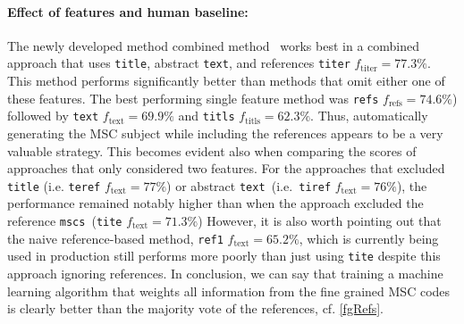 \paragraph{Effect of features and human baseline:}
The newly developed method combined method~\cite{Scharpf2020} works best in a combined approach that uses \texttt{title}, abstract \texttt{text}, and references \texttt{titer} \(f_{\mathrm{titer}} = 77.3\%.\)
This method performs significantly better than methods that omit either one of these features.
The best performing single feature method was \texttt{refs} \(f_{\mathrm{refs}} = 74.6\%\)) followed by \texttt{text} \(f_{\mathrm{text}} = 69.9\%\) and \texttt{titls} \(f_{\mathrm{titls}} = 62.3\%\).
Thus, automatically generating the MSC subject while including the references appears to be a very valuable strategy.
This becomes evident also when comparing the scores of approaches that only considered two features. For the approaches that excluded \texttt{title} (i.e. \texttt{teref} \(f_{\mathrm{text}} = 77\%\)) or abstract \texttt{text}\texttt{\ }(i.e.\texttt{\ }\texttt{tiref} \(f_{\mathrm{text}} = 76\%\)), the performance remained notably higher than when the approach excluded the reference \texttt{mscs}\ (\texttt{tite} \(f_{\mathrm{text}} = 71.3\%\))
However, it is also worth pointing out that the naive reference-based method, \texttt{ref1} \(f_{\mathrm{text}} = 65.2\%\), which is currently being used in production still performs more poorly than just using \texttt{tite} despite this approach ignoring references.
In conclusion, we can say that training a machine learning algorithm that weights all information from the fine grained MSC codes is clearly better than the majority vote of the references, cf. \ref{fgRefs}.



